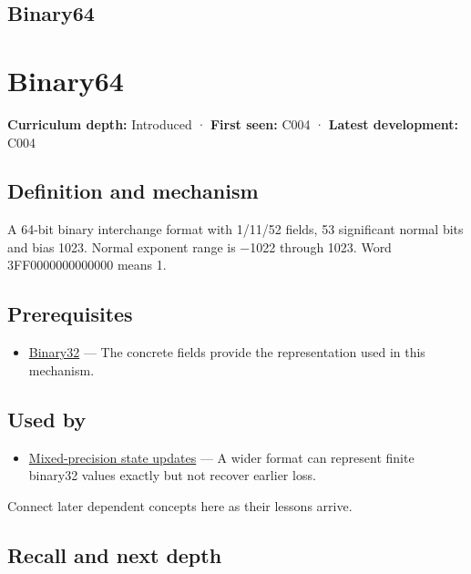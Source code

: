 \hypertarget{appendix-5078dfab64e6}{}
\section*{Binary64}
\chapter{Binary64}\label{appendix-5078dfab64e6-binary64}

\textbf{Curriculum depth:} Introduced · \textbf{First seen:} C004 · \textbf{Latest development:} C004

\section{Definition and mechanism}\label{appendix-5078dfab64e6-definition-and-mechanism}

A 64-bit binary interchange format with 1/11/52 fields, 53 significant normal bits and bias 1023. Normal exponent range is −1022 through 1023. Word 3FF0000000000000 means 1.

\section{Prerequisites}\label{appendix-5078dfab64e6-prerequisites}

\begin{itemize}
\tightlist
\item
  \hyperref[appendix-5057f9ad327f]{Binary32} --- The concrete fields provide the representation used in this mechanism.
\end{itemize}

\section{Used by}\label{appendix-5078dfab64e6-used-by}

\begin{itemize}
\tightlist
\item
  \hyperref[appendix-260182e617b7]{Mixed-precision state updates} --- A wider format can represent finite binary32 values exactly but not recover earlier loss.
\end{itemize}

Connect later dependent concepts here as their lessons arrive.

\section{Recall and next depth}\label{appendix-5078dfab64e6-recall-and-next-depth}

